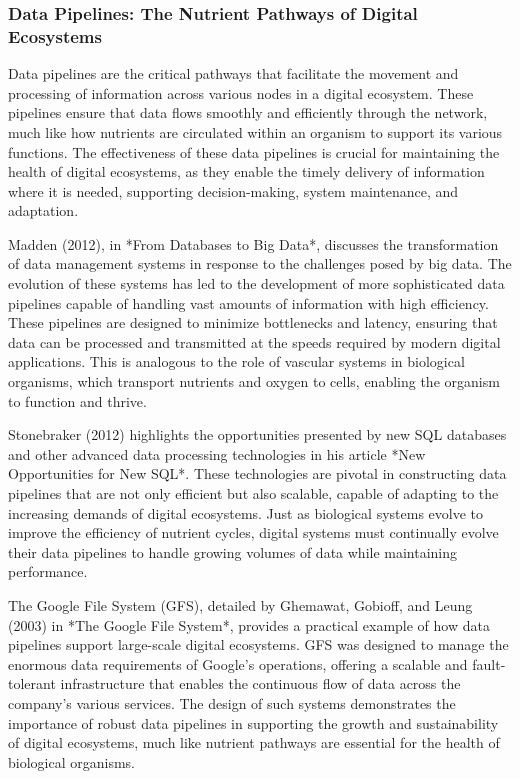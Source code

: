 \documentclass[12pt,twoside]{article}
\begin{document}
\subsubsection{Data Pipelines: The Nutrient Pathways of Digital Ecosystems}

Data pipelines are the critical pathways that facilitate the movement and processing of information across various nodes in a digital ecosystem. These pipelines ensure that data flows smoothly and efficiently through the network, much like how nutrients are circulated within an organism to support its various functions. The effectiveness of these data pipelines is crucial for maintaining the health of digital ecosystems, as they enable the timely delivery of information where it is needed, supporting decision-making, system maintenance, and adaptation.

Madden (2012), in *From Databases to Big Data*, discusses the transformation of data management systems in response to the challenges posed by big data. The evolution of these systems has led to the development of more sophisticated data pipelines capable of handling vast amounts of information with high efficiency. These pipelines are designed to minimize bottlenecks and latency, ensuring that data can be processed and transmitted at the speeds required by modern digital applications. This is analogous to the role of vascular systems in biological organisms, which transport nutrients and oxygen to cells, enabling the organism to function and thrive.

Stonebraker (2012) highlights the opportunities presented by new SQL databases and other advanced data processing technologies in his article *New Opportunities for New SQL*. These technologies are pivotal in constructing data pipelines that are not only efficient but also scalable, capable of adapting to the increasing demands of digital ecosystems. Just as biological systems evolve to improve the efficiency of nutrient cycles, digital systems must continually evolve their data pipelines to handle growing volumes of data while maintaining performance.

The Google File System (GFS), detailed by Ghemawat, Gobioff, and Leung (2003) in *The Google File System*, provides a practical example of how data pipelines support large-scale digital ecosystems. GFS was designed to manage the enormous data requirements of Google’s operations, offering a scalable and fault-tolerant infrastructure that enables the continuous flow of data across the company’s various services. The design of such systems demonstrates the importance of robust data pipelines in supporting the growth and sustainability of digital ecosystems, much like nutrient pathways are essential for the health of biological organisms.
\end{document}
